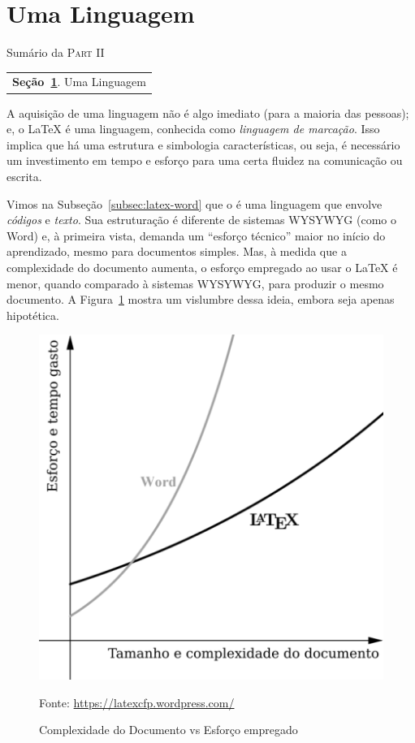 \section{Uma Linguagem} %
\label{sec:aprendendo} 

\begin{margintable}\vspace{.8in}\footnotesize
  \caption{Sumário da \textsc{Part II}}
  \medskip
  \begin{tabularx}{\marginparwidth}{|X}
    \textbf{\sffamily \textcolor{azulUFRB}{Seção}~\ref{sec:aprendendo}}.    {\sffamily Uma Linguagem} \\
  \end{tabularx}
\end{margintable}

A aquisição de uma linguagem não é algo imediato (para a maioria das pessoas); e,
o \LaTeX{} é uma linguagem, conhecida como \textit{linguagem de marcação}.
Isso implica que há uma \textsf{estrutura} e \textsf{simbologia} características, 
ou seja, é necessário um investimento em tempo e esforço para uma certa fluidez 
na comunicação ou escrita.

Vimos na Subseção~\ref{subsec:latex-word} que o  é uma linguagem 
que envolve \textit{códigos} e \textit{texto}.
Sua estruturação é diferente de sistemas \textsf{WYSYWYG} (como o Word) e, à
primeira vista, demanda um ``esforço técnico'' maior no início do aprendizado, 
mesmo para documentos simples.
Mas, à medida que a complexidade do documento aumenta, o esforço empregado ao 
usar o \LaTeX{} é menor, quando comparado à sistemas \textsf{WYSYWYG}, para 
produzir o mesmo documento.
A Figura~\ref{fig:latex-vs-word} mostra um vislumbre dessa ideia, embora seja
apenas hipotética.

\begin{figure}[!htbp]
  \centering
  \caption{Complexidade do Documento vs Esforço empregado}
  \label{fig:latex-vs-word}
  \medskip
  \includegraphics[width = 0.6\linewidth]{figs/latex-vs-word.png}
  
  {\small \textsf{Fonte:} \url{https://latexcfp.wordpress.com/}}
\end{figure}

